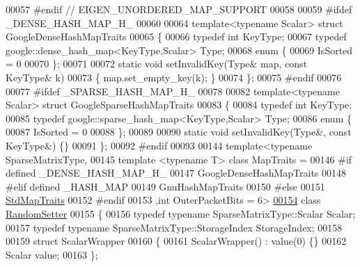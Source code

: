 \begin{DoxyCode}
00057 \textcolor{preprocessor}{#endif // EIGEN\_UNORDERED\_MAP\_SUPPORT}
00058 
00059 \textcolor{preprocessor}{#ifdef \_DENSE\_HASH\_MAP\_H\_}
00060 
00064 \textcolor{keyword}{template}<\textcolor{keyword}{typename} Scalar> \textcolor{keyword}{struct }GoogleDenseHashMapTraits
00065 \{
00066   \textcolor{keyword}{typedef} \textcolor{keywordtype}{int} KeyType;
00067   \textcolor{keyword}{typedef} google::dense\_hash\_map<KeyType,Scalar> Type;
00068   \textcolor{keyword}{enum} \{
00069     IsSorted = 0
00070   \};
00071 
00072   \textcolor{keyword}{static} \textcolor{keywordtype}{void} setInvalidKey(Type& map, \textcolor{keyword}{const} KeyType& k)
00073   \{ map.set\_empty\_key(k); \}
00074 \};
00075 \textcolor{preprocessor}{#endif}
00076 
00077 \textcolor{preprocessor}{#ifdef \_SPARSE\_HASH\_MAP\_H\_}
00078 
00082 \textcolor{keyword}{template}<\textcolor{keyword}{typename} Scalar> \textcolor{keyword}{struct }GoogleSparseHashMapTraits
00083 \{
00084   \textcolor{keyword}{typedef} \textcolor{keywordtype}{int} KeyType;
00085   \textcolor{keyword}{typedef} google::sparse\_hash\_map<KeyType,Scalar> Type;
00086   \textcolor{keyword}{enum} \{
00087     IsSorted = 0
00088   \};
00089 
00090   \textcolor{keyword}{static} \textcolor{keywordtype}{void} setInvalidKey(Type&, \textcolor{keyword}{const} KeyType&) \{\}
00091 \};
00092 \textcolor{preprocessor}{#endif}
00093 
00144 \textcolor{keyword}{template}<\textcolor{keyword}{typename} SparseMatrixType,
00145          \textcolor{keyword}{template} <\textcolor{keyword}{typename} T> \textcolor{keyword}{class }MapTraits =
00146 \textcolor{preprocessor}{#if defined \_DENSE\_HASH\_MAP\_H\_}
00147           GoogleDenseHashMapTraits
00148 \textcolor{preprocessor}{#elif defined \_HASH\_MAP}
00149           GnuHashMapTraits
00150 \textcolor{preprocessor}{#else}
00151           \hyperlink{struct_eigen_1_1_std_map_traits}{StdMapTraits}
00152 \textcolor{preprocessor}{#endif}
00153          ,\textcolor{keywordtype}{int} OuterPacketBits = 6>
\hyperlink{class_eigen_1_1_random_setter}{00154} \textcolor{keyword}{class }\hyperlink{class_eigen_1_1_random_setter}{RandomSetter}
00155 \{
00156     \textcolor{keyword}{typedef} \textcolor{keyword}{typename} SparseMatrixType::Scalar Scalar;
00157     \textcolor{keyword}{typedef} \textcolor{keyword}{typename} SparseMatrixType::StorageIndex StorageIndex;
00158 
00159     \textcolor{keyword}{struct }ScalarWrapper
00160     \{
00161       ScalarWrapper() : value(0) \{\}
00162       Scalar value;
00163     \};

\end{DoxyCode}

